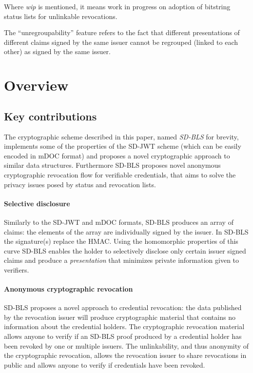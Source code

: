 Where \emph{wip} is mentioned, it means work in progress on adoption of
bitstring status lists for unlinkable revocations.

The ``unregroupability'' feature refers to the fact that different
presentations of different claims signed by the same issuer cannot be
regrouped (linked to each other) as signed by the same issuer.

\section{Overview}

\subsection{Key contributions}
The cryptographic scheme described in this paper, named
\textit{SD-BLS} for brevity, implements some of the properties of the
SD-JWT scheme (which can be easily encoded in mDOC format) and
proposes a novel cryptographic approach to similar data
structures. Furthermore SD-BLS proposes novel anonymous cryptographic
revocation flow for verifiable credentials, that aims to solve the
privacy issues posed by status and revocation lists.

\paragraph{Selective disclosure}
Similarly to the SD-JWT and mDOC formats, SD-BLS produces an array of
claims: the elements of the array are individually signed by the
issuer. In SD-BLS the signature(s) replace the HMAC. Using the
homomorphic properties of this curve SD-BLS enables the holder to
selectively disclose only certain issuer signed claims and produce a
\textit{presentation} that minimizes private information given to
verifiers.

\paragraph{Anonymous cryptographic revocation}
SD-BLS proposes a novel approach to credential revocation: the data
published by the revocation issuer will produce cryptographic material
that contains no information about the credential holders. The
cryptographic revocation material allows anyone to verify if an SD-BLS
proof produced by a credential holder has been revoked by one or
multiple issuers. The unlinkability, and thus anonymity of the
cryptographic revocation, allows the revocation issuer to share
revocations in public and allows anyone to verify if credentials have
been revoked.

